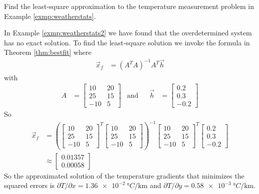 \begin{exmp}
Find the least-square approximation to the temperature measurement problem in Example \ref{exmp:weatherstats}.
\end{exmp}
\begin{solution}
In Example \ref{exmp:weatherstats2} we have found that the overdetermined system has no exact solution. To find the least-square solution we invoke the formula in Theorem \ref{thm:bestfit} where
\begin{align*}
\vec{x}_f &= (A^TA)^{-1}A^T\vec{h}
\end{align*}
with 
\begin{align*}
A &= 
\begin{bmatrix}
10 & 20 \\
25 & 15 \\
-10 & 5
\end{bmatrix}
& \text{and} &
& \vec{h} &= \begin{bmatrix}
0.2 \\
0.3 \\
-0.2
\end{bmatrix}
\end{align*}
So
\begin{align*}
\vec{x}_f &= 
\left(\begin{bmatrix}
10 & 20 \\
25 & 15 \\
-10 & 5
\end{bmatrix}^T
\begin{bmatrix}
10 & 20 \\
25 & 15 \\
-10 & 5
\end{bmatrix}\right)^{-1}
\begin{bmatrix}
10 & 20 \\
25 & 15 \\
-10 & 5
\end{bmatrix}^T
\begin{bmatrix}
0.2 \\
0.3 \\
-0.2
\end{bmatrix} \\
&\approx 
\begin{bmatrix}
0.01357 \\
0.00058
\end{bmatrix}
\end{align*}
So the approximated solution of the temperature gradients that minimizes the squared errors is $\partial T/\partial x = \SI{1.36e-2}{\degree C \per \km} $ and $\partial T/\partial y = \SI{0.58e-3}{\degree C \per \km}$.
\end{solution}

